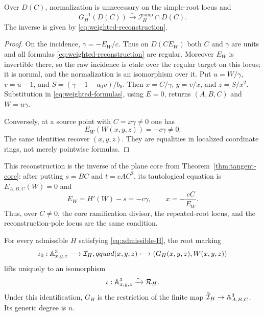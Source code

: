 \begin{proposition}\label{prop:weighted-Cnonzero}
Over $D(C)$, normalization is unnecessary on the simple-root locus and
\[
 G_H^{-1}(D(C))\xrightarrow{\sim}
 \mathcal I_H^{\mathrm{simp}}\cap D(C).
\]
The inverse is given by \eqref{eq:weighted-reconstruction}.
\end{proposition}

\begin{proof}
On the incidence, $\gamma=-E_W/c$.  Thus on $D(C E_W)$ both $C$ and
$\gamma$ are units and all formulas \eqref{eq:weighted-reconstruction} are
regular.  Moreover $E_W$ is invertible there, so the raw incidence is etale
over the regular target on this locus; it is normal, and the normalization is
an isomorphism over it.  Put $u=W/\gamma$, $v=u-1$, and
$S=(\gamma-1-a_0v)/b_0$.  Then $x=C/\gamma$, $y=v/x$, and $z=S/x^2$.
Substitution in \eqref{eq:weighted-formulas}, using $E=0$, returns
$(A,B,C)$ and $W=u\gamma$.

Conversely, at a source point with $C=x\gamma\ne0$ one has
\[
 E_W(W(x,y,z))=-c\gamma\ne0.
\]
The same identities recover $(x,y,z)$.  They are equalities in localized
coordinate rings, not merely pointwise formulas.
\end{proof}

This reconstruction is the inverse of the plane core from
Theorem~\ref{thm:tangent-core}: after putting $s=BC$ and $t=cAC^2$, its
tautological equation is $E_{A,B,C}(W)=0$ and
\[
 E_W=H'(W)-s=-c\gamma,
 \qquad x=-\frac{cC}{E_W}.
\]
Thus, over $C\ne0$, the core ramification divisor, the repeated-root locus,
and the reconstruction-pole locus are the same condition.

\begin{theorem}\label{thm:weighted-global}
For every admissible $H$ satisfying \eqref{eq:admissible-H}, the root marking
\[
 \iota_0:\mathbb A^3_{x,y,z}\longrightarrow\mathcal I_H,qquad
 (x,y,z)\longmapsto(G_H(x,y,z),W(x,y,z))
\]
lifts uniquely to an isomorphism
\[
 \iota:\mathbb A^3_{x,y,z}\xrightarrow{\sim}\mathcal R_H.
\]
Under this identification, $G_H$ is the restriction of the finite map
$\widetilde{\mathcal I}_H\to\mathbb A^3_{A,B,C}$.  Its generic degree is $n$.
\end{theorem}

